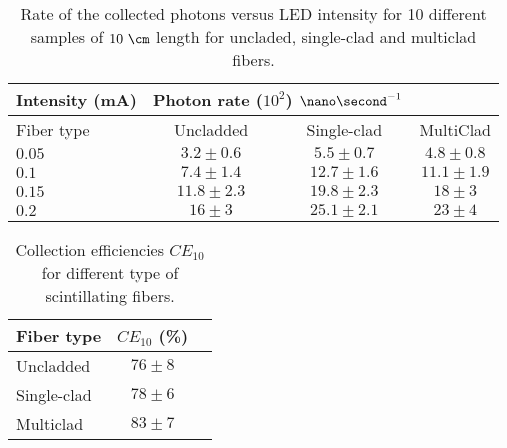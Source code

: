 \begin{table}[htbp]
\centering{}%
\begin{tabular}{lccc}
\toprule 
Intensity (mA) & \multicolumn{2}{c}{Photon rate ($10^{2}$) $\nano\second^{-1}$} \tabularnewline
\midrule
Fiber type & Uncladded & Single-clad & MultiClad \tabularnewline
\midrule
\midrule
$0.05$ & $3.2 \pm 0.6$ & $5.5 \pm 0.7$ & $4.8 \pm 0.8$ \tabularnewline
$0.1$ & $7.4 \pm 1.4$ & $12.7 \pm 1.6$ & $11.1 \pm 1.9$ \tabularnewline
$0.15$ & $11.8 \pm 2.3$ & $19.8 \pm 2.3$ & $18\pm 3$ \tabularnewline
$0.2$ & $16 \pm 3$ & $25.1 \pm 2.1$ & $23 \pm 4$ \tabularnewline
\bottomrule
\end{tabular}
\caption{Rate of the collected photons versus LED intensity for 10 different samples of $10~\cm$ length for uncladed, single-clad and multiclad fibers.}
\label{tab:10DifferentSamplesAlltypes}
\end{table}



\begin{table}[htbp]
\centering{}%
\begin{tabular}{lcc}
\toprule 
Fiber type & $CE_{10}$ (\%) \tabularnewline
\midrule
\midrule 
Uncladded & $76 \pm 8$ \tabularnewline
Single-clad & $78 \pm 6$ \tabularnewline
Multiclad & $83 \pm 7$ \tabularnewline
\bottomrule
\end{tabular}
\caption{Collection efficiencies $CE_{10}$ for different type of scintillating fibers.}
\label{tab:CollectionEfficiencyOfFibers}
\end{table}



